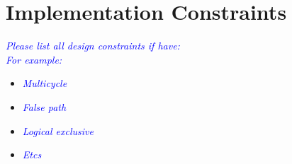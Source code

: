 
\clearpage

\section{Implementation Constraints}
\noindent\textit{\textcolor{blue}{Please list all design constraints if have: \\
For example:
}}
\begin{itemize}
    \item \noindent\textit{\textcolor{blue}{Multicycle}}
    \item \noindent\textit{\textcolor{blue}{False path}}
    \item \noindent\textit{\textcolor{blue}{Logical exclusive}} 
    \item \noindent\textit{\textcolor{blue}{Etcs}}
\end{itemize}